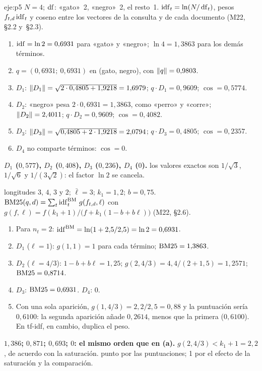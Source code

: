 \begin{solucion}{eje:p5}
\datos $N=4$; $\operatorname{df}$: «gato»~2, «negro»~2, el resto~1.
\planteamiento $\operatorname{idf}_t=\ln(N/\operatorname{df}_t)$, pesos $f_{t,d}\operatorname{idf}_t$ y coseno entre los vectores de la consulta y de cada documento (M22, §2.2 y~§2.3).
\pasos
\begin{enumerate}[label=\arabic*.]
  \item $\operatorname{idf}=\ln 2=0{,}6931$ para «gato» y «negro»; $\ln 4=1{,}3863$ para los demás términos.
  \item $q=(0{,}6931;\ 0{,}6931)$ en (gato, negro), con $\lVert q\rVert=0{,}9803$.
  \item $D_1$: $\lVert D_1\rVert=\sqrt{2\cdot 0{,}4805+1{,}9218}=1{,}6979$; $q\cdot D_1=0{,}9609$; $\cos=0{,}5774$.
  \item $D_2$: «negro» pesa $2\cdot 0{,}6931=1{,}3863$, como «perro» y «corre»; $\lVert D_2\rVert=2{,}4011$; $q\cdot D_2=0{,}9609$; $\cos=0{,}4082$.
  \item $D_3$: $\lVert D_3\rVert=\sqrt{0{,}4805+2\cdot 1{,}9218}=2{,}0794$; $q\cdot D_3=0{,}4805$; $\cos=0{,}2357$.
  \item $D_4$ no comparte términos: $\cos=0$.
\end{enumerate}
\resultado \textbf{$D_1$ ($0{,}577$), $D_2$ ($0{,}408$), $D_3$ ($0{,}236$), $D_4$ ($0$).}
\comprobacion los valores exactos son $1/\sqrt3$, $1/\sqrt6$ y $1/(3\sqrt2)$: el factor $\ln 2$ se cancela.

\datos longitudes $3$, $4$, $3$ y $2$; $\bar\ell=3$; $k_1=1{,}2$; $b=0{,}75$.
\planteamiento $\operatorname{BM25}(q,d)=\sum_t\operatorname{idf}^{\mathrm{BM}}_t\,g(f_{t,d},\ell)$ con $g(f,\ell)=f(k_1+1)/\bigl(f+k_1(1-b+b\ell)\bigr)$ (M22, §2.6).
\pasos
\begin{enumerate}[label=\arabic*.]
  \item Para $n_t=2$: $\operatorname{idf}^{\mathrm{BM}}=\ln(1+2{,}5/2{,}5)=\ln 2=0{,}6931$.
  \item $D_1$ ($\ell=1$): $g(1,1)=1$ para cada término; $\operatorname{BM25}=1{,}3863$.
  \item $D_2$ ($\ell=4/3$): $1-b+b\ell=1{,}25$; $g(2,4/3)=4{,}4/(2+1{,}5)=1{,}2571$; $\operatorname{BM25}=0{,}8714$.
  \item $D_3$: $\operatorname{BM25}=0{,}6931$. $D_4$: $0$.
  \item Con una sola aparición, $g(1,4/3)=2{,}2/2{,}5=0{,}88$ y la puntuación sería $0{,}6100$: la segunda aparición añade $0{,}2614$, menos que la primera ($0{,}6100$). En tf-idf, en cambio, duplica el peso.
\end{enumerate}
\resultado \textbf{$1{,}386$; $0{,}871$; $0{,}693$; $0$: el mismo orden que en (a).}
\comprobacion $g(2,4/3)<k_1+1=2{,}2$, de acuerdo con la saturación.
 punto por las puntuaciones; 1 por el efecto de la saturación y la comparación.


\end{solucion}
